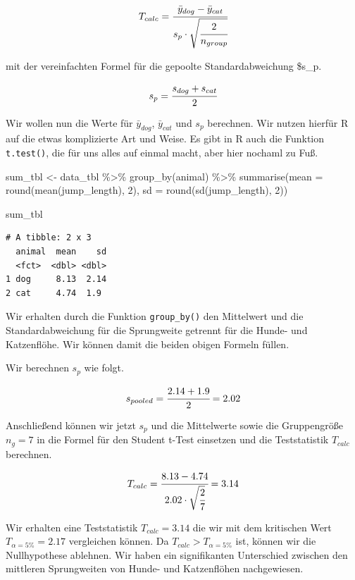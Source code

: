 \documentclass[
  letterpaper,
  DIV=11,
  oneside]{scrreport}
\newenvironment{Shaded}{\begin{snugshade}}{\end{snugshade}}
\newcommand{\AttributeTok}[1]{\textcolor[rgb]{0.40,0.45,0.13}{#1}}
\newcommand{\DecValTok}[1]{\textcolor[rgb]{0.68,0.00,0.00}{#1}}
\newcommand{\FunctionTok}[1]{\textcolor[rgb]{0.28,0.35,0.67}{#1}}
\newcommand{\NormalTok}[1]{\textcolor[rgb]{0.00,0.23,0.31}{#1}}
\newcommand{\OtherTok}[1]{\textcolor[rgb]{0.00,0.23,0.31}{#1}}
\newcommand{\SpecialCharTok}[1]{\textcolor[rgb]{0.37,0.37,0.37}{#1}}
\begin{document}
\[
T_{calc} = \cfrac{\bar{y}_{dog}-\bar{y}_{cat}}{s_{p} \cdot \sqrt{\cfrac{2}{n_{group}}}}
\]

mit der vereinfachten Formel für die gepoolte Standardabweichung \$s\_p.

\[
s_{p} = \cfrac{s_{dog} + s_{cat}}{2}
\]

Wir wollen nun die Werte für \(\bar{y}_{dog}\), \(\bar{y}_{cat}\) und
\(s_{p}\) berechnen. Wir nutzen hierfür R auf die etwas komplizierte Art
und Weise. Es gibt in R auch die Funktion \texttt{t.test()}, die für uns
alles auf einmal macht, aber hier nochaml zu Fuß.

\begin{Shaded}
\begin{Highlighting}[]
\NormalTok{sum\_tbl }\OtherTok{\textless{}{-}}\NormalTok{ data\_tbl }\SpecialCharTok{\%\textgreater{}\%} 
  \FunctionTok{group\_by}\NormalTok{(animal) }\SpecialCharTok{\%\textgreater{}\%} 
  \FunctionTok{summarise}\NormalTok{(}\AttributeTok{mean =} \FunctionTok{round}\NormalTok{(}\FunctionTok{mean}\NormalTok{(jump\_length), }\DecValTok{2}\NormalTok{), }
            \AttributeTok{sd =} \FunctionTok{round}\NormalTok{(}\FunctionTok{sd}\NormalTok{(jump\_length), }\DecValTok{2}\NormalTok{)) }

\NormalTok{sum\_tbl}
\end{Highlighting}
\end{Shaded}

\begin{verbatim}
# A tibble: 2 x 3
  animal  mean    sd
  <fct>  <dbl> <dbl>
1 dog     8.13  2.14
2 cat     4.74  1.9 
\end{verbatim}

Wir erhalten durch die Funktion \texttt{group\_by()} den Mittelwert und
die Standardabweichung für die Sprungweite getrennt für die Hunde- und
Katzenflöhe. Wir können damit die beiden obigen Formeln füllen.

Wir berechnen \(s_p\) wie folgt.

\[
s_{pooled} = \cfrac{2.14 + 1.9}{2} = 2.02
\]

Anschließend können wir jetzt \(s_p\) und die Mittelwerte sowie die
Gruppengröße \(n_g = 7\) in die Formel für den Student t-Test einsetzen
und die Teststatistik \(T_{calc}\) berechnen.

\[
T_{calc} = \cfrac{8.13- 4.74}{2.02 \cdot \sqrt{\cfrac{2}{7}}} = 3.14
\]

Wir erhalten eine Teststatistik \(T_{calc} = 3.14\) die wir mit dem
kritischen Wert \(T_{\alpha = 5\%} = 2.17\) vergleichen können. Da
\(T_{calc} > T_{\alpha = 5\%}\) ist, können wir die Nullhypothese
ablehnen. Wir haben ein signifikanten Unterschied zwischen den mittleren
Sprungweiten von Hunde- und Katzenflöhen nachgewiesen.
\end{document}
